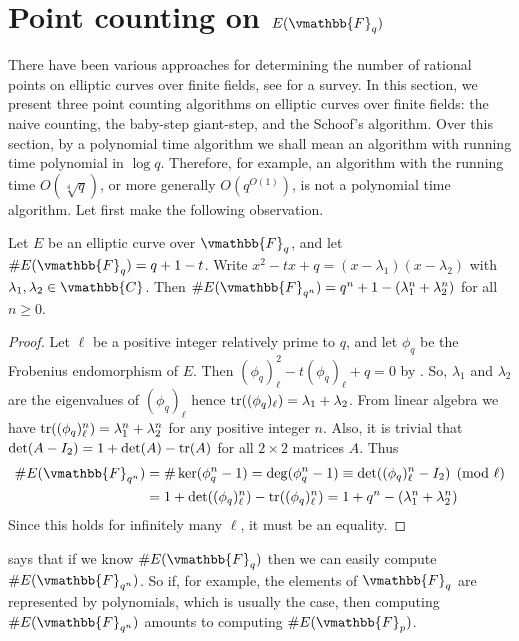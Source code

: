 \section{Point counting on $E(\vmathbb{F}_q)$}
\label{section:elli-pointcount}

There have been various approaches for determining the number of rational points on elliptic curves 
over finite fields, see \cite{Blake1999} for a survey. In this section, we present three point 
counting algorithms on elliptic curves over finite fields: the naive counting, the baby-step 
giant-step, and the Schoof's algorithm. Over this section, by a polynomial time algorithm we shall 
mean an algorithm with running time polynomial in $\log q$. Therefore, for example, an algorithm 
with the running time $O(\sqrt[4]{q})$, or more generally $O(q^{O(1)})$, is not a polynomial time 
algorithm. Let first make the following observation. 
\begin{theorem}
\label{theorem:Weil-subfc}
Let $E$ be an elliptic curve over $\vmathbb{F}_q$, and let $\#E(\vmathbb{F}_q) = q + 1 - t$. Write 
$x^2 - tx + q = (x - \lambda_1)(x - \lambda_2)$ with $\lambda_1, \lambda_2 \in \vmathbb{C}$. Then 
$\#E(\vmathbb{F}_{q^n}) = q^n + 1 - (\lambda_1^n + \lambda_2^n)$ for all $n \ge 0$.
\end{theorem}
\begin{proof}
Let $\ell$ be a positive integer relatively prime to $q$, and let $\phi_q$ be the Frobenius 
endomorphism of $E$. Then $(\phi_q)_\ell^2 - t(\phi_q)_\ell + q = 0$ by . 
So, $\lambda_1$ and $\lambda_2$ are the eigenvalues of $(\phi_q)_\ell$ hence $\operatorname{tr}((\phi_q)_\ell) 
= \lambda_1 + \lambda_2$. From linear algebra we have $\operatorname{tr}((\phi_q)_\ell^n) = \lambda_1^n + 
\lambda_2^n$ for any positive integer $n$. Also, it is trivial that $\det(A - I_2) = 1 + \det(A) - 
\operatorname{tr}(A)$ for all $2 \times 2$ matrices $A$. Thus
\begin{align*}
\#E(\vmathbb{F}_{q^n}) 
&= \#\ker(\phi_q^n - 1) = \deg(\phi_q^n - 1) \equiv \det((\phi_q)_\ell^n - I_2) \pmod \ell \\
&= 1 + \det((\phi_q)_\ell^n) - \trace((\phi_q)_\ell^n) = 1 + q^n - (\lambda_1^n + \lambda_2^n)
\end{align*}
Since this holds for infinitely many $\ell$, it must be an equality. 
\end{proof}
 says that if we know $\#E(\vmathbb{F}_q)$ then we can easily compute 
$\#E(\vmathbb{F}_{q^n})$. So if, for example, the elements of $\vmathbb{F}_q$ are represented by 
polynomials, which is usually the case, then computing $\#E(\vmathbb{F}_{q^n})$ amounts to computing 
$\#E(\vmathbb{F}_p)$. 



